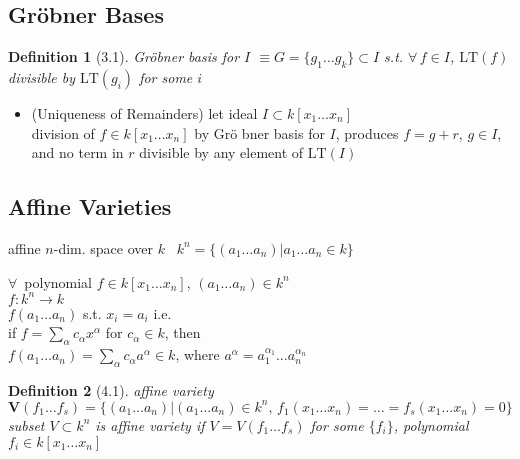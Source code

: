 \documentclass[10pt]{amsart}
\newtheorem{definition}{Definition}
\begin{document}
\begin{multicols*}{2}
\subsection{}

\subsection{Gr\"obner Bases}

\begin{definition}[3.1]
  Gr\"obner basis for $I$ $\equiv G = \lbrace g_1 \dots g_k \rbrace \subset I$ s.t. $\forall \, f \in I$, $\text{LT}(f)$ divisible by $\text{LT}(g_i)$ for some $i$
\end{definition}

\begin{itemize}
\item (Uniqueness of Remainders) let ideal $I\subset k[x_1 \dots x_n]$ \\
division of $f\in k[x_1 \dots x_n]$ by Gr\"o bner basis for $I$, produces $f=g+r$, $g\in I$, and no term in $r$ divisible by any element of $\text{LT}(I)$
\end{itemize}





\subsection{Affine Varieties}

affine $n$-dim. space over $k$ \quad \, $k^n = \lbrace (a_1 \dots a_n ) | a_1 \dots a_n \in k \rbrace$

$\forall \, $ polynomial $f\in k[x_1 \dots x_n ]$, $(a_1 \dots a_n) \in k^n$ \\
\phantom{ \quad } $f: k^n \to k$ \\
\phantom{ \quad } $f(a_1 \dots a_n)$ s.t. $x_i = a_i$ i.e. \\

if $f= \sum_{\alpha} c_{\alpha} x^{\alpha}$ for $c_{\alpha} \in k$, then  \\
\phantom{ \quad } $f(a_1 \dots a_n) =\sum_{\alpha} c_{\alpha}a^{\alpha} \in k$, where $a^{\alpha} = a_1^{\alpha_1} \dots a_n^{\alpha_n}$

\begin{definition}[4.1]
affine variety $\mathbf{V}(f_1 \dots f_s) = \lbrace ( a_1 \dots a_n) | (a_1 \dots a_n) \in k^n, \, f_1(x_1 \dots x_n) = \dots = f_s(x_1 \dots x_n) = 0 \rbrace$ \\
subset $V\subset k^n$ is affine variety if $V = V(f_1 \dots f_s)$ for some $\lbrace f_i \rbrace$, polynomial $f_i \in k[x_1 \dots x_n]$
\end{definition}


\end{multicols*}
\end{document}
